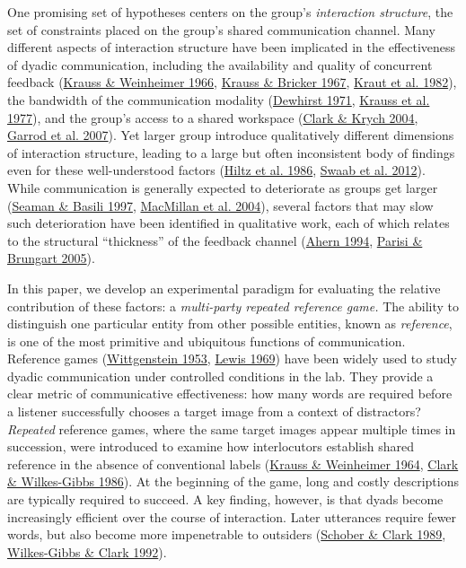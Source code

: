 \documentclass[
  english,
]{article}
\begin{document}
One promising set of hypotheses centers on the group's \emph{interaction structure}, the set of constraints placed on the group's shared communication channel.
Many different aspects of interaction structure have been implicated in the effectiveness of dyadic communication, including the availability and quality of concurrent feedback (\protect\hyperlink{ref-krauss1966}{Krauss \& Weinheimer 1966}, \protect\hyperlink{ref-KraussBricker67_Delay}{Krauss \& Bricker 1967}, \protect\hyperlink{ref-kraut1982listener}{Kraut et al. 1982}), the bandwidth of the communication modality (\protect\hyperlink{ref-dewhirst1971influence}{Dewhirst 1971}, \protect\hyperlink{ref-KraussEtAl77}{Krauss et al. 1977}), and the group's access to a shared workspace (\protect\hyperlink{ref-clark2004speaking}{Clark \& Krych 2004}, \protect\hyperlink{ref-garrod2007foundations}{Garrod et al. 2007}).
Yet larger group introduce qualitatively different dimensions of interaction structure, leading to a large but often inconsistent body of findings even for these well-understood factors (\protect\hyperlink{ref-hiltz1986experiments}{Hiltz et al. 1986}, \protect\hyperlink{ref-swaab2012communication}{Swaab et al. 2012}).
While communication is generally expected to deteriorate as groups get larger (\protect\hyperlink{ref-seaman1997communication}{Seaman \& Basili 1997}, \protect\hyperlink{ref-macmillan_communication_2004}{MacMillan et al. 2004}), several factors that may slow such deterioration have been identified in qualitative work, each of which relates to the structural ``thickness'' of the feedback channel (\protect\hyperlink{ref-ahern1994effect}{Ahern 1994}, \protect\hyperlink{ref-parisi2005evaluating}{Parisi \& Brungart 2005}).

In this paper, we develop an experimental paradigm for evaluating the relative contribution of these factors: a \emph{multi-party repeated reference game.}
The ability to distinguish one particular entity from other possible entities, known as \emph{reference}, is one of the most primitive and ubiquitous functions of communication.
Reference games (\protect\hyperlink{ref-Wittgenstein1953}{Wittgenstein 1953}, \protect\hyperlink{ref-lewis1969convention}{Lewis 1969}) have been widely used to study dyadic communication under controlled conditions in the lab.
They provide a clear metric of communicative effectiveness: how many words are required before a listener successfully chooses a target image from a context of distractors?
\emph{Repeated} reference games, where the same target images appear multiple times in succession, were introduced to examine how interlocutors establish shared reference in the absence of conventional labels (\protect\hyperlink{ref-krauss1964}{Krauss \& Weinheimer 1964}, \protect\hyperlink{ref-clark1986}{Clark \& Wilkes-Gibbs 1986}).
At the beginning of the game, long and costly descriptions are typically required to succeed.
A key finding, however, is that dyads become increasingly efficient over the course of interaction.
Later utterances require fewer words, but also become more impenetrable to outsiders (\protect\hyperlink{ref-schober1989}{Schober \& Clark 1989}, \protect\hyperlink{ref-wilkes1992coordinating}{Wilkes-Gibbs \& Clark 1992}).
\end{document}
